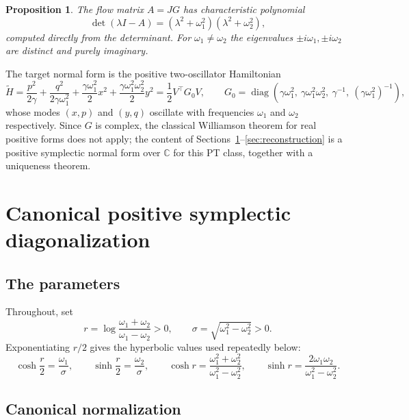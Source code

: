 \documentclass[11pt]{article}
\newtheorem{proposition}[theorem]{Proposition}
\theoremstyle{definition}
\theoremstyle{remark}
\newcommand{\C}{\mathbb{C}}
\newcommand{\w}{\omega}
\newcommand{\diag}{\operatorname{diag}}
\begin{document}
\begin{proposition}\label{prop:spectrum}
The flow matrix $A=JG$ has characteristic polynomial
\begin{equation}
\det(\lambda I-A)=(\lambda^2+\w_1^2)(\lambda^2+\w_2^2),
\end{equation}
computed directly from the determinant.  For $\w_1\neq\w_2$ the eigenvalues
$\pm i\w_1,\pm i\w_2$ are distinct and purely imaginary.
\end{proposition}

The target normal form is the positive two-oscillator Hamiltonian
\begin{equation}\label{eq:G0}
\widetilde H=\frac{p^2}{2\gamma}+\frac{q^2}{2\gamma\w_1^2}
+\frac{\gamma\w_1^2}{2}x^2+\frac{\gamma\w_1^2\w_2^2}{2}y^2
=\frac12V^{\top}G_0V,
\qquad
G_0=\diag\!\left(\gamma\w_1^2,\ \gamma\w_1^2\w_2^2,\ \gamma^{-1},\
(\gamma\w_1^2)^{-1}\right),
\end{equation}
whose modes $(x,p)$ and $(y,q)$ oscillate with frequencies $\w_1$ and $\w_2$
respectively.  Since $G$ is complex, the classical Williamson theorem
\cite{Williamson1936} for real positive forms does not apply; the content of
Sections~\ref{sec:diag}--\ref{sec:reconstruction} is a positive symplectic
normal form over $\C$ for this PT class, together with a uniqueness theorem.

\section{Canonical positive symplectic diagonalization}\label{sec:diag}

\subsection{The parameters}

Throughout, set
\begin{equation}\label{eq:r}
r=\log\frac{\w_1+\w_2}{\w_1-\w_2}>0,
\qquad
\sigma=\sqrt{\w_1^2-\w_2^2}>0 .
\end{equation}
Exponentiating $r/2$ gives the hyperbolic values used repeatedly below:
\begin{equation}\label{eq:hyp}
\cosh\frac r2=\frac{\w_1}{\sigma},\qquad
\sinh\frac r2=\frac{\w_2}{\sigma},\qquad
\cosh r=\frac{\w_1^2+\w_2^2}{\w_1^2-\w_2^2},\qquad
\sinh r=\frac{2\w_1\w_2}{\w_1^2-\w_2^2}.
\end{equation}

\subsection{Canonical normalization}\label{ssec:normalization}
\end{document}
